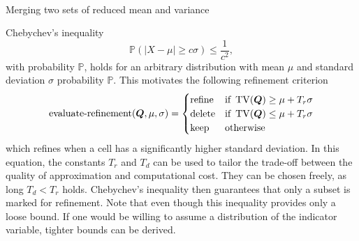 \begin{algorithm}[ht]
  \begin{algorithmic}
  \State{}
\EndIf\
  \State{}
\EndIf\
  \Let{$m_b$}{$\variance_1 (\gobsCount_1 - 1)$}
  \State\Return{$
    \nicefrac{\mean_\Sigma}{\gobsCount_\Sigma},
    \nicefrac{m_\text{total}}{\gobsCount_\Sigma - 1},
    \gobsCount_\Sigma
    $}
\EndFunction\
  \end{algorithmic}
  \caption{\label{alg:merge-variance}
    Merging two sets of reduced mean and variance~\cite{chan1982updating}}
\end{algorithm}
Chebychev's inequality
\begin{equation}
  \label{eq:chebychev}
  \mathbb{P}(\vert X - \mu \vert \geq c \sigma) \leq \frac{1}{c^2},
\end{equation}
with probability $\mathbb{P}$,
holds for an arbitrary distribution with mean $\mu$ and standard deviation $\sigma$ probability $\mathbb{P}$.
This motivates the following refinement criterion
\begin{equation}
  \label{eq:refinement-criterion}
  \operatorname{evaluate-refinement}(\bm{Q}, \mu, \sigma) =
  \begin{cases}
    \text{refine} & \text{if } \operatorname{TV}(\bm{Q}) \geq \mu + T_r \sigma \\
    \text{delete} & \text{if } \operatorname{TV}(\bm{Q}) \leq \mu + T_r \sigma \\
    \text{keep} & \text{otherwise}
    \end{cases}
\end{equation}
which refines when a cell has a significantly higher standard deviation.
In this equation, the constants $T_r$ and $T_d$ can be used to tailor the trade-off between the quality of approximation and computational cost.
They can be chosen freely, as long $T_d < T_r$ holds.
Chebychev's inequality then guarantees that only a subset is marked for refinement.
Note that even though this inequality provides only a loose bound.
If one would be willing to assume a distribution of the indicator variable, tighter bounds can be derived.

